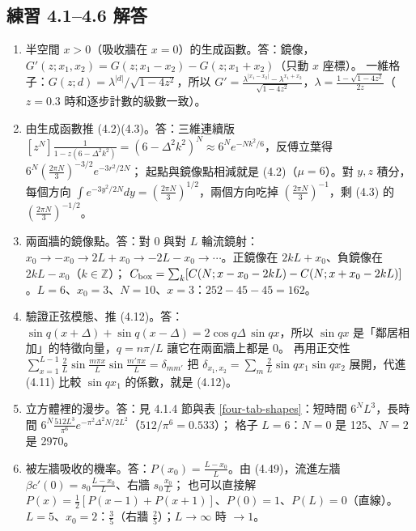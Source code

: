 \subsection{練習 4.1--4.6 解答}
{\small
\begin{enumerate}[label=\textbf{4.\arabic*},itemsep=0.05em]
\item 半空間 $x>0$（吸收牆在 $x=0$）的生成函數。\quad 答：鏡像，$G'(z;x_1,x_2)=G(z;x_1-x_2)-G(z;x_1+x_2)$（只動 $x$ 座標）。
一維格子：$G(z;d)=\lambda^{|d|}/\sqrt{1-4z^2}$，所以 $G'=\frac{\lambda^{|x_1-x_2|}-\lambda^{x_1+x_2}}{\sqrt{1-4z^2}}$，$\lambda=\frac{1-\sqrt{1-4z^2}}{2z}$（$z=0.3$ 時和逐步計數的級數一致）。
\item 由生成函數推 (4.2)(4.3)。\quad 答：三維連續版 $[z^N]\frac{1}{1-z(6-\Delta^2k^2)}=(6-\Delta^2k^2)^N\approx6^Ne^{-Nk^2/6}$，反傅立葉得 $6^N(\frac{2\pi N}{3})^{-3/2}e^{-3r^2/2N}$；
起點與鏡像點相減就是 (4.2)（$\mu=6$）。對 $y,z$ 積分，每個方向 $\int e^{-3y^2/2N}dy=(\frac{2\pi N}{3})^{1/2}$，兩個方向吃掉 $(\frac{2\pi N}{3})^{-1}$，剩 (4.3) 的 $(\frac{2\pi N}{3})^{-1/2}$。
\item 兩面牆的鏡像點。\quad 答：對 0 與對 $L$ 輪流鏡射：$x_0\to-x_0\to2L+x_0\to-2L-x_0\to\cdots$。正鏡像在 $2kL+x_0$、負鏡像在 $2kL-x_0$（$k\in\mathbb Z$）；
$C_{\rm box}=\sum_k[C(N;x-x_0-2kL)-C(N;x+x_0-2kL)]$。$L=6$、$x_0=3$、$N=10$、$x=3$：$252-45-45=162$。
\item 驗證正弦模態、推 (4.12)。\quad 答：$\sin q(x+\Delta)+\sin q(x-\Delta)=2\cos q\Delta\,\sin qx$，所以 $\sin qx$ 是「鄰居相加」的特徵向量，$q=n\pi/L$ 讓它在兩面牆上都是 0。
再用正交性 $\sum_{x=1}^{L-1}\frac2L\sin\frac{m\pi x}{L}\sin\frac{m'\pi x}{L}=\delta_{mm'}$ 把 $\delta_{x_1,x_2}=\sum_m\frac2L\sin qx_1\sin qx_2$ 展開，代進 (4.11) 比較 $\sin qx_1$ 的係數，就是 (4.12)。
\item 立方體裡的漫步。\quad 答：見 4.1.4 節與表 \ref{four-tab-shapes}：短時間 $6^NL^3$，長時間 $6^N\frac{512L^3}{\pi^6}e^{-\pi^2\Delta^2N/2L^2}$（$512/\pi^6=0.533$）；
格子 $L=6$：$N=0$ 是 125、$N=2$ 是 2970。
\item 被左牆吸收的機率。\quad 答：$P(x_0)=\frac{L-x_0}{L}$。由 (4.49)，流進左牆 $\beta c'(0)=s_0\frac{L-x_0}{L}$、右牆 $s_0\frac{x_0}{L}$；
也可以直接解 $P(x)=\frac12[P(x-1)+P(x+1)]$、$P(0)=1$、$P(L)=0$（直線）。$L=5$、$x_0=2$：$\frac35$（右牆 $\frac25$）；$L\to\infty$ 時 $\to1$。
\end{enumerate}}


